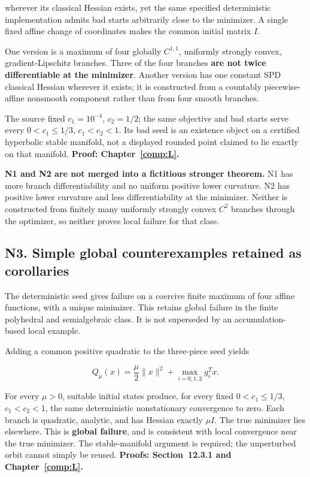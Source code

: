 wherever its classical Hessian exists, yet the same specified deterministic implementation admits bad starts arbitrarily close to the minimizer. A single fixed affine change of coordinates makes the common initial matrix \(I\).

One version is a maximum of four globally \(C^{1,1}\), uniformly strongly convex, gradient-Lipschitz branches. Three of the four branches \textbf{are not twice differentiable at the minimizer}. Another version has one constant SPD classical Hessian wherever it exists; it is constructed from a countably piecewise-affine nonsmooth component rather than from four smooth branches.

The source fixed \(c_1=10^{-4}\), \(c_2=1/2\); the same objective and bad starts serve every \(0<c_1\le1/3\), \(c_1<c_2<1\). Its bad seed is an existence object on a certified hyperbolic stable manifold, not a displayed rounded point claimed to lie exactly on that manifold. \textbf{Proof: Chapter~\ref{comp:L}.}

\textbf{N1 and N2 are not merged into a fictitious stronger theorem.} N1 has more branch differentiability and no uniform positive lower curvature. N2 has positive lower curvature and less differentiability at the minimizer. Neither is constructed from finitely many uniformly strongly convex \(C^2\) branches through the optimizer, so neither proves local failure for that class.



\subsection{N3. Simple global counterexamples retained as corollaries}\label{n3.-simple-global-counterexamples-retained-as-corollaries}

The deterministic seed gives failure on a coercive finite maximum of four affine functions, with a unique minimizer. This retains global failure in the finite polyhedral and semialgebraic class. It is not superseded by an accumulation-based local example.

Adding a common positive quadratic to the three-piece seed yields

\[
 Q_\mu(x)=\frac\mu2\|x\|^2+\max_{i=0,1,2}g_i^Tx.
\]

For every \(\mu>0\), suitable initial states produce, for every fixed \(0<c_1\le1/3\), \(c_1<c_2<1\), the same deterministic nonstationary convergence to zero. Each branch is quadratic, analytic, and has Hessian exactly \(\mu I\). The true minimizer lies elsewhere. This is \textbf{global failure}, and is consistent with local convergence near the true minimizer. The stable-manifold argument is required; the unperturbed orbit cannot simply be reused. \textbf{Proofs: Section~12.3.1 and Chapter~\ref{comp:L}.}

